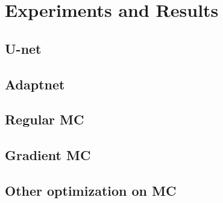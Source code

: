 \section{Experiments and Results}
\subsection{U-net}
\subsection{Adaptnet}
\subsection{Regular MC}
\subsection{Gradient MC}
\subsection{Other optimization on MC}
